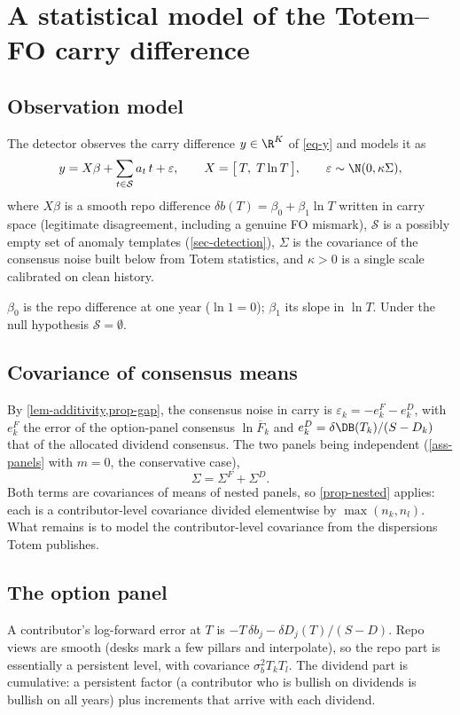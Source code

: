 \section{A statistical model of the Totem--FO carry difference}\label{sec-noise}

\subsection{Observation model}
\begin{definition}\label{def-obs}
The detector observes the carry difference $y\in\R^K$ of \cref{eq-y} and models it as
\begin{equation}\label{eq-obs}
y=X\beta+\sum_{t\in\mathcal{S}}a_t\,t+\varepsilon,\qquad X=\bigl[\,T,\;T\ln T\,\bigr],\qquad\varepsilon\sim\N(0,\kappa\Sigma),
\end{equation}
where $X\beta$ is a smooth repo difference $\delta b(T)=\beta_0+\beta_1\ln T$ written in carry space (legitimate
disagreement, including a genuine FO mismark), $\mathcal{S}$ is a possibly empty set of anomaly templates
(\cref{sec-detection}), $\Sigma$ is the covariance of the consensus noise built below from Totem statistics, and
$\kappa>0$ is a single scale calibrated on clean history.
\end{definition}
$\beta_0$ is the repo difference at one year ($\ln1=0$); $\beta_1$ its slope in $\ln T$. Under the null hypothesis
$\mathcal{S}=\emptyset$.

\subsection{Covariance of consensus means}
By \cref{lem-additivity,prop-gap}, the consensus noise in carry is $\varepsilon_k=-e^F_k-e^D_k$, with $e^F_k$ the
error of the option-panel consensus $\ln\overline{F}_k$ and $e^D_k=\delta\DB(T_k)/(S-D_k)$ that of the allocated
dividend consensus. The two panels being independent (\cref{ass-panels} with $m=0$, the conservative case),
\begin{equation}\label{eq-sigma}
\Sigma=\Sigma^F+\Sigma^D.
\end{equation}
Both terms are covariances of means of nested panels, so \cref{prop-nested} applies: each is a contributor-level
covariance divided elementwise by $\max(n_k,n_l)$. What remains is to model the contributor-level covariance from the
dispersions Totem publishes.

\subsection{The option panel}
A contributor's log-forward error at $T$ is $-T\,\delta b_j-\delta D_j(T)/(S-D)$. Repo views are smooth (desks mark a
few pillars and interpolate), so the repo part is essentially a persistent level, with covariance
$\sigma_b^2T_kT_l$. The dividend part is cumulative: a persistent factor (a contributor who is bullish on dividends
is bullish on all years) plus increments that arrive with each dividend.

